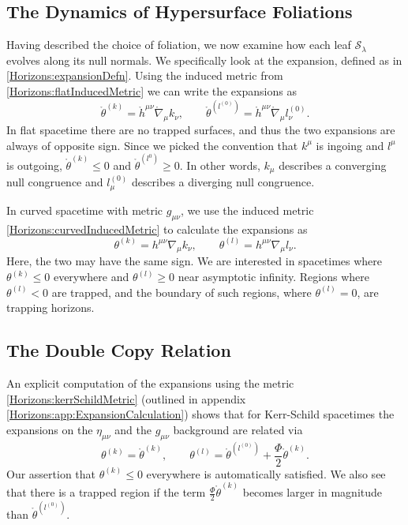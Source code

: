 \subsection{The Dynamics of Hypersurface Foliations}
Having described the choice of foliation, we now examine how each leaf $\mathcal{S}_{\lambda}$ evolves along its 
null normals. We specifically look at the expansion, defined as in \eqref{Horizons:expansionDefn}.
Using the induced metric from \eqref{Horizons:flatInducedMetric} we can write the expansions as
\begin{equation} \label{Horizons:flatExpansions} 
    \mathring{\theta}^{(k)} = \mathring{h}^{\mu \nu} \mathring{\nabla}_{\mu} k_{\nu}, \qquad
    \mathring{\theta}^{(l^{(0)})} = \mathring{h}^{\mu \nu} \mathring{ \nabla}_{\mu} l^{(0)}_{\nu}.
\end{equation}
In flat spacetime there are no trapped surfaces, and thus the two expansions are always of opposite sign. Since we
picked the convention that $k^{\mu}$ is ingoing and $l^{\mu}$ is outgoing, $\mathring{\theta}^{(k)} \leq 0$ and
$\mathring{\theta}^{(l^{0})} \geq 0$. In other words, $k_{\mu}$ describes a converging null congruence and
$l^{(0)}_{\mu}$ describes a diverging null congruence.

In curved spacetime with metric $g_{\mu \nu}$, we use the induced metric \eqref{Horizons:curvedInducedMetric} to calculate
the expansions as
\begin{equation} \label{Horizons:curvedExpansions} 
    \theta^{(k)} = h^{\mu \nu} \nabla_{\mu} k_{\nu}, \qquad \theta^{(l)} = h^{\mu \nu} \nabla_{\mu} l_{\nu}.
\end{equation}
Here, the two may have the same sign. We are interested in spacetimes where $\theta^{(k)} \leq 0$ everywhere and
$\theta^{(l)} \geq 0$ near asymptotic infinity. Regions where $\theta^{(l)} < 0$ are trapped, and the boundary of
such regions, where $\theta^{(l)} = 0$, are trapping horizons.

\subsection{The Double Copy Relation} \label{Horizons:sec:doubleCopyRelation}
An explicit computation of the expansions using the metric \eqref{Horizons:kerrSchildMetric} (outlined in appendix
\ref{Horizons:app:ExpansionCalculation}) shows that for Kerr-Schild spacetimes the expansions on the $\eta_{\mu \nu}$ and
the $g_{\mu \nu}$ background are related via
\begin{equation} \label{Horizons:thetaFromTheta0} 
    \theta^{(k)} = \mathring{\theta}^{(k)}, \qquad \theta^{(l)} = \mathring{\theta}^{(l^{(0)})} + \frac{\Phi}{2}
    \mathring{\theta}^{(k)}.
\end{equation}
Our assertion that $\theta^{(k)} \leq 0$ everywhere is automatically satisfied. We also see that there is a trapped
region if the term $\frac{\Phi}{2} \mathring{\theta}^{(k)}$ becomes larger in magnitude than
$\mathring{\theta}^{(l^{(0)})}$.

